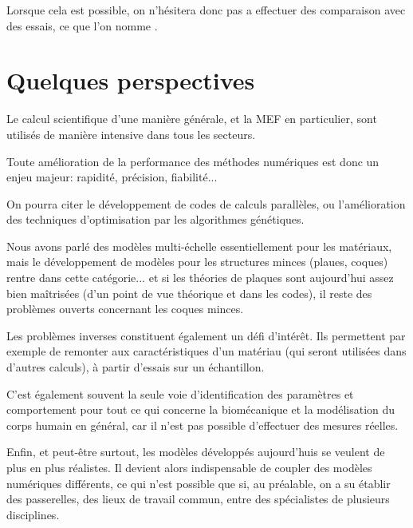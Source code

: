 Lorsque cela est possible, on n'hésitera donc pas a effectuer des comparaison avec des essais, ce que l'on nomme
.



\medskip
\section*{Quelques perspectives}

Le calcul scientifique d'une manière générale, et la MEF en particulier, sont utilisés de manière intensive dans
tous les secteurs.

\medskip
Toute amélioration de la performance des méthodes numériques est donc un enjeu majeur: rapidité,
précision, fiabilité...

On pourra citer le développement de codes de calculs parallèles, ou l'amélioration des techniques d'optimisation 
par les algorithmes génétiques.

\medskip
Nous avons parlé des modèles multi-échelle essentiellement pour les matériaux, mais le développement de modèles 
pour les structures minces (plaues, coques) rentre dans cette catégorie... et si les théories de plaques sont aujourd'hui
assez bien maîtrisées (d'un point de vue théorique et dans les codes), il reste des problèmes ouverts concernant
les coques minces.

\medskip
Les problèmes inverses constituent également un défi d'intérêt.
Ils permettent par exemple de remonter aux caractéristiques d'un matériau (qui seront utilisées dans d'autres
calculs), à partir d'essais sur un échantillon.

C'est également souvent la seule voie d'identification des paramètres et comportement pour tout ce qui
concerne la biomécanique et la modélisation du corps humain en général, car il n'est pas possible d'effectuer
des mesures réelles.

\medskip
Enfin, et peut-être surtout, les modèles développés aujourd'huis se veulent de plus en plus réalistes.
Il devient alors indispensable de coupler des modèles numériques différents, ce qui n'est possible
que si, au préalable, on a su établir des passerelles, des lieux de travail commun, entre des
spécialistes de plusieurs disciplines.
